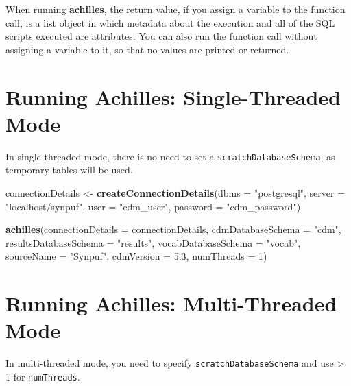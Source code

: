 \documentclass[]{article}
\newenvironment{Shaded}{\begin{snugshade}}{\end{snugshade}}
\newcommand{\KeywordTok}[1]{\textcolor[rgb]{0.13,0.29,0.53}{\textbf{#1}}}
\newcommand{\DataTypeTok}[1]{\textcolor[rgb]{0.13,0.29,0.53}{#1}}
\newcommand{\DecValTok}[1]{\textcolor[rgb]{0.00,0.00,0.81}{#1}}
\newcommand{\FloatTok}[1]{\textcolor[rgb]{0.00,0.00,0.81}{#1}}
\newcommand{\StringTok}[1]{\textcolor[rgb]{0.31,0.60,0.02}{#1}}
\newcommand{\NormalTok}[1]{#1}
\begin{document}
When running \textbf{achilles}, the return value, if you assign a
variable to the function call, is a list object in which metadata about
the execution and all of the SQL scripts executed are attributes. You
can also run the function call without assigning a variable to it, so
that no values are printed or returned.

\section{Running Achilles: Single-Threaded
Mode}\label{running-achilles-single-threaded-mode}

In single-threaded mode, there is no need to set a
\texttt{scratchDatabaseSchema}, as temporary tables will be used.

\begin{Shaded}
\begin{Highlighting}[]
\NormalTok{connectionDetails <-}\StringTok{ }\KeywordTok{createConnectionDetails}\NormalTok{(}\DataTypeTok{dbms =} \StringTok{"postgresql"}\NormalTok{, }
                                             \DataTypeTok{server =} \StringTok{"localhost/synpuf"}\NormalTok{, }
                                             \DataTypeTok{user =} \StringTok{"cdm_user"}\NormalTok{, }
                                             \DataTypeTok{password =} \StringTok{"cdm_password"}\NormalTok{)}

\KeywordTok{achilles}\NormalTok{(}\DataTypeTok{connectionDetails =}\NormalTok{ connectionDetails, }
         \DataTypeTok{cdmDatabaseSchema =} \StringTok{"cdm"}\NormalTok{, }
         \DataTypeTok{resultsDatabaseSchema =} \StringTok{"results"}\NormalTok{, }
         \DataTypeTok{vocabDatabaseSchema =} \StringTok{"vocab"}\NormalTok{, }
         \DataTypeTok{sourceName =} \StringTok{"Synpuf"}\NormalTok{, }
         \DataTypeTok{cdmVersion =} \FloatTok{5.3}\NormalTok{, }
         \DataTypeTok{numThreads =} \DecValTok{1}\NormalTok{)}
\end{Highlighting}
\end{Shaded}

\section{Running Achilles: Multi-Threaded
Mode}\label{running-achilles-multi-threaded-mode}

In multi-threaded mode, you need to specify
\texttt{scratchDatabaseSchema} and use \textgreater{} 1 for
\texttt{numThreads}.
\end{document}

